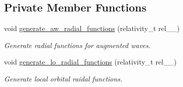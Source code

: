 \subsection*{Private Member Functions}
\begin{DoxyCompactItemize}
\item 
void \hyperlink{classsirius_1_1_atom__symmetry__class_a0021449cbbcc76df9aca1072125bdcae}{generate\+\_\+aw\+\_\+radial\+\_\+functions} (relativity\+\_\+t rel\+\_\+\+\_\+)
\begin{DoxyCompactList}\small\item\em Generate radial functions for augmented waves. \end{DoxyCompactList}\item 
void \hyperlink{classsirius_1_1_atom__symmetry__class_a1ad404f1acabf28700a55dfd6db9d8aa}{generate\+\_\+lo\+\_\+radial\+\_\+functions} (relativity\+\_\+t rel\+\_\+\+\_\+)
\begin{DoxyCompactList}\small\item\em Generate local orbital raidal functions. \end{DoxyCompactList}\end{DoxyCompactItemize}
